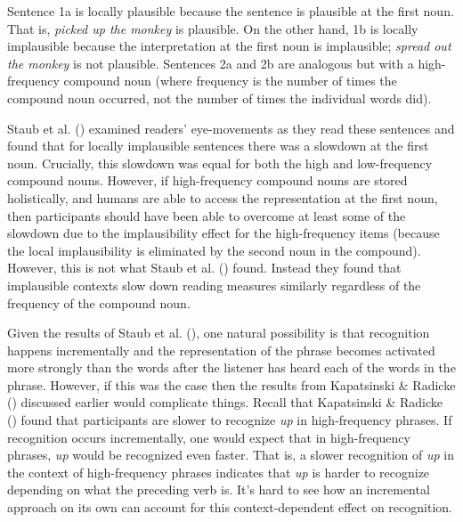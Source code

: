 \documentclass[
  12pt,
  letterpaper,
]{scrreport}
\begin{document}
Sentence 1a is locally plausible because the sentence is plausible at
the first noun. That is, \emph{picked up the monkey} is plausible. On
the other hand, 1b is locally implausible because the interpretation at
the first noun is implausible; \emph{spread out the monkey} is not
plausible. Sentences 2a and 2b are analogous but with a high-frequency
compound noun (where frequency is the number of times the compound noun
occurred, not the number of times the individual words did).

Staub et al. ()
examined readers' eye-movements as they read these sentences and found
that for locally implausible sentences there was a slowdown at the first
noun. Crucially, this slowdown was equal for both the high and
low-frequency compound nouns. However, if high-frequency compound nouns
are stored holistically, and humans are able to access the
representation at the first noun, then participants should have been
able to overcome at least some of the slowdown due to the implausibility
effect for the high-frequency items (because the local implausibility is
eliminated by the second noun in the compound). However, this is not
what Staub et al. ()
found. Instead they found that implausible contexts slow down reading
measures similarly regardless of the frequency of the compound noun.

Given the results of Staub et al.
(), one natural
possibility is that recognition happens incrementally and the
representation of the phrase becomes activated more strongly than the
words after the listener has heard each of the words in the phrase.
However, if this was the case then the results from Kapatsinski \&
Radicke ()
discussed earlier would complicate things. Recall that Kapatsinski \&
Radicke ()
found that participants are slower to recognize \emph{up} in
high-frequency phrases. If recognition occurs incrementally, one would
expect that in high-frequency phrases, \emph{up} would be recognized
even faster. That is, a slower recognition of \emph{up} in the context
of high-frequency phrases indicates that \emph{up} is harder to
recognize depending on what the preceding verb is. It's hard to see how
an incremental approach on its own can account for this
context-dependent effect on recognition.
\end{document}
